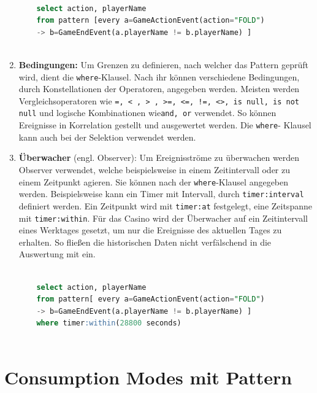 \begin{enumerate}
	\begin{lstlisting}[caption={Pattern mit Follow-Operator },label=follow_pattern,captionpos=b,language=SQL]
	
	select action, playerName 
	from pattern [every a=GameActionEvent(action="FOLD") 
	-> b=GameEndEvent(a.playerName != b.playerName) ]
	
	\end{lstlisting}
	
	\item \textbf{Bedingungen:}
	Um Grenzen zu definieren, nach welcher das Pattern geprüft wird, dient die \texttt{where}-Klausel. Nach ihr können verschiedene Bedingungen, durch Konstellationen der Operatoren, angegeben werden.
	Meisten werden Vergleichsoperatoren wie \texttt{=, < , > , >=, <=, !=, <>, is null, is not null} und logische Kombinationen wie\texttt{and, or} verwendet. So können Ereignisse in Korrelation gestellt und ausgewertet werden. Die \texttt{where}- Klausel kann auch bei der Selektion verwendet werden.
	
	\item \textbf{Überwacher} (engl. Observer):
	Um Ereignisströme zu überwachen werden Observer verwendet, welche beispielsweise in einem Zeitintervall oder zu einem Zeitpunkt agieren. Sie können nach der \texttt{where}-Klausel angegeben werden. Beispielsweise kann ein Timer mit Intervall, durch \texttt{timer:interval} definiert werden. Ein Zeitpunkt wird
	mit \texttt{timer:at} festgelegt, eine Zeitspanne mit \texttt{timer:within}. Für das Casino wird der Überwacher auf ein Zeitintervall eines Werktages gesetzt, um nur die Ereignisse des aktuellen Tages zu erhalten. So fließen die historischen Daten nicht verfälschend in die Auswertung mit ein.
	
	\begin{lstlisting}[caption={Pattern mit Observer },label=observer_pattern,captionpos=b,language=SQL]
	
	select action, playerName 
	from pattern[ every a=GameActionEvent(action="FOLD") 
	-> b=GameEndEvent(a.playerName != b.playerName) ]
	where timer:within(28800 seconds)
	
	\end{lstlisting}
	
\end{enumerate}

\section{Consumption Modes mit Pattern}

